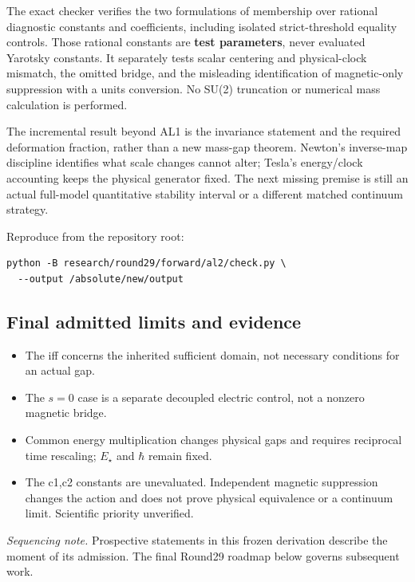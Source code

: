 The exact checker verifies the two formulations of membership over rational diagnostic constants and coefficients, including isolated strict-threshold equality controls. Those rational constants are \textbf{test parameters}, never evaluated Yarotsky constants. It separately tests scalar centering and physical-clock mismatch, the omitted bridge, and the misleading identification of magnetic-only suppression with a units conversion. No SU(2) truncation or numerical mass calculation is performed.

The incremental result beyond AL1 is the invariance statement and the required deformation fraction, rather than a new mass-gap theorem. Newton's inverse-map discipline identifies what scale changes cannot alter; Tesla's energy/clock accounting keeps the physical generator fixed. The next missing premise is still an actual full-model quantitative stability interval or a different matched continuum strategy.

Reproduce from the repository root:
\begin{verbatim}
python -B research/round29/forward/al2/check.py \
  --output /absolute/new/output
\end{verbatim}

\subsection*{Final admitted limits and evidence}
\begin{itemize}
\item The iff concerns the inherited sufficient domain, not necessary conditions for an actual gap.
\item The \(s=0\) case is a separate decoupled electric control, not a nonzero magnetic bridge.
\item Common energy multiplication changes physical gaps and requires reciprocal time rescaling; \(E_\star\) and \(\hbar\) remain fixed.
\item The c1,c2 constants are unevaluated. Independent magnetic suppression changes the action and does not prove physical equivalence or a continuum limit. Scientific priority unverified.
\end{itemize}
\par{}\par{}

\emph{Sequencing note.} Prospective statements in this frozen derivation describe the moment of its admission. The final Round29 roadmap below governs subsequent work.
